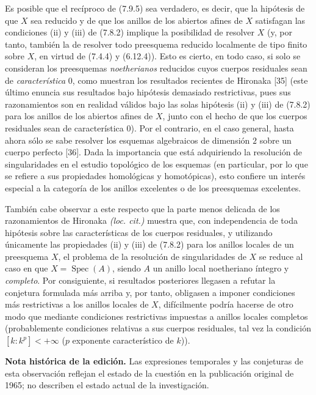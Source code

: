 \begin{remark}[7.9.6]
\label{IV.2.s7.9.6-fr}
Es posible que el recíproco de (7.9.5) sea verdadero, es decir, que
la hipótesis de que $X$ sea reducido y de que los anillos de los abiertos afines de $X$
satisfagan las condiciones (ii) y (iii) de (7.8.2) implique la posibilidad de
resolver $X$ (y, por tanto, también la de resolver todo preesquema
reducido localmente de tipo finito sobre $X$, en virtud de (7.4.4) y (6.12.4)).
Esto es cierto, en todo caso, si solo se consideran los preesquemas \emph{noetherianos} reducidos
cuyos cuerpos residuales sean de \emph{característica} $0$, como muestran
los resultados recientes de Hironaka [35] (este último enuncia sus resultados bajo
hipótesis demasiado restrictivas, pues sus razonamientos son en realidad válidos
bajo las solas hipótesis (ii) y (iii) de (7.8.2) para los anillos de los
abiertos afines de $X$, junto con el hecho de que los cuerpos residuales sean de
característica $0$). Por el contrario, en el caso general, hasta ahora
sólo se sabe resolver los esquemas algebraicos de dimensión $2$ sobre un cuerpo perfecto
[36]. Dada la importancia que está adquiriendo la resolución de singularidades
en el estudio topológico de los esquemas (en particular, por lo que se refiere
a sus propiedades homológicas y homotópicas), esto confiere un interés
especial a la categoría de los anillos excelentes o de los preesquemas
excelentes.

También cabe observar a este respecto que la parte menos delicada de los
razonamientos de Hironaka \emph{(loc. cit.)} muestra que, con independencia de toda
hipótesis sobre las características de los cuerpos residuales, y utilizando
únicamente las propiedades (ii) y (iii) de (7.8.2) para los anillos locales
de un preesquema $X$, el problema de la resolución de singularidades de $X$ se
reduce al caso en que $X=\operatorname{Spec}(A)$, siendo $A$ un anillo local
noetheriano íntegro y \emph{completo}. Por consiguiente, si resultados
posteriores llegasen a refutar la conjetura formulada más arriba y,
por tanto, obligasen a imponer condiciones más restrictivas a los
anillos locales de $X$, difícilmente podría hacerse de otro modo que mediante
condiciones restrictivas impuestas a anillos locales completos (probablemente
condiciones relativas a sus cuerpos residuales, tal vez la condición
$[k:k^p]<+\infty$ ($p$ exponente característico de $k$)).
\end{remark}

\par\smallskip
{\small\noindent\textbf{Nota histórica de la edición.}
Las expresiones temporales y las conjeturas de esta observación reflejan el estado de la cuestión en la publicación original de 1965; no describen el estado actual de la investigación.}\par
